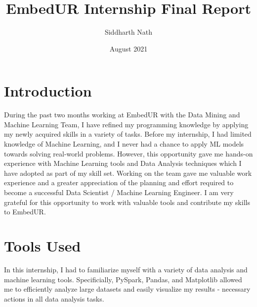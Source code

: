 \documentclass{article}
\title{\LARGE EmbedUR Internship Final Report}
\author{\Large Siddharth Nath}
\date{\Large August 2021}
\begin{document}
\maketitle
\newpage

\tableofcontents
\newpage

\section{Introduction}

During the past two months working at EmbedUR with the Data Mining and Machine Learning Team, I have refined my programming knowledge by applying my newly acquired skills in a variety of tasks. Before my internship, I had limited knowledge of Machine Learning, and I never had a chance to apply ML models towards solving real-world problems. However, this opportunity gave me hands-on experience with Machine Learning tools and Data Analysis techniques which I have adopted as part of my skill set. Working on the team gave me valuable work experience and a greater appreciation of the planning and effort required to become a successful Data Scientist / Machine Learning Engineer. I am very grateful for this opportunity to work with valuable tools and contribute my skills to EmbedUR. 

\section{Tools Used}

In this internship, I had to familiarize myself with a variety of data analysis and machine learning tools. Specificially, PySpark, Pandas, and Matplotlib allowed me to efficiently analyze large datasets and easily visualize my results - necessary actions in all data analysis tasks.
\end{document}
